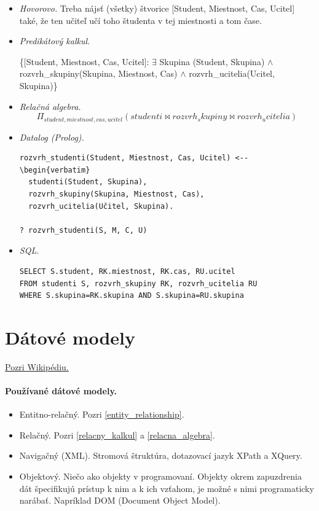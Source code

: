 \documentclass[10pt,a4paper]{article}
\begin{document}
\begin{itemize}
\item \emph{Hovorovo.} Treba nájsť (všetky) štvorice [Student, Miestnost, Cas, Ucitel]
také, že ten učiteľ učí toho študenta v tej miestnosti a tom čase. 
\item \emph{Predikátový kalkul.}

\{[Student, Miestnost, Cas, Ucitel]: $\exists$ Skupina (Student, Skupina) $\wedge$ rozvrh\_skupiny(Skupina, Miestnost, Cas) $\wedge$ rozvrh\_ucitelia(Ucitel, Skupina)\}
\item \emph{Relačná algebra.}
$$
\Pi_{student, miestnost, cas, ucitel}(studenti \Join rozvrh_skupiny \Join rozvrh_ucitelia)
$$
\item \emph{Datalog (Prolog).}
\begin{verbatim}
rozvrh_studenti(Student, Miestnost, Cas, Ucitel) <--
\begin{verbatim}
  studenti(Student, Skupina),
  rozvrh_skupiny(Skupina, Miestnost, Cas),
  rozvrh_ucitelia(Učitel, Skupina).

? rozvrh_studenti(S, M, C, U)
\end{verbatim} 

\item \emph{SQL.}
\begin{verbatim}
SELECT S.student, RK.miestnost, RK.cas, RU.ucitel
FROM studenti S, rozvrh_skupiny RK, rozvrh_ucitelia RU
WHERE S.skupina=RK.skupina AND S.skupina=RU.skupina
\end{verbatim}

\end{itemize}

\section{Dátové modely} 
\href{http://en.wikipedia.org/wiki/Database_model}{Pozri Wikipédiu.}

\paragraph{Používané dátové modely.}
\begin{itemize}
\item Entitno-relačný. Pozri \ref{entity_relationship}. 
\item Relačný. Pozri \ref{relacny_kalkul} a \ref{relacna_algebra}. 
\item Navigačný (XML). Stromová štruktúra, dotazovací jazyk XPath a XQuery. 
\item Objektový. Niečo ako objekty v programovaní. Objekty okrem zapuzdrenia dát špecifikujú prístup k nim a k ich vzťahom, je možné s nimi programaticky narábať. Napríklad DOM (Document Object Model). 
\end{itemize}
\end{document}
